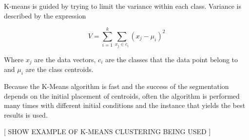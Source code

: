 K-means is guided by trying to limit the variance within each class. Variance is described by the expression

\begin{equation}\label{eq:2}
   V = \sum_{i=1}^k\sum_{x_j\in c_i}(x_j-\mu_i)^2 
\end{equation}

Where {$x_j$} are the data vectors, $c_i$ are the classes that the data point belong to and $\mu_i$ are the class centroids.

Because the K-Means algorithm is fast and the success of the segmentation depends on the initial placement of centroids, often the algorithm is performed many times with different initial conditions and the instance that yields the best results is used. 


[ SHOW EXAMPLE OF K-MEANS CLUSTERING BEING USED ]